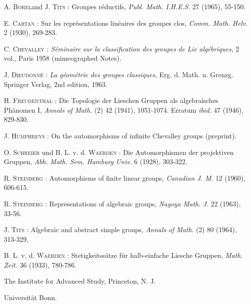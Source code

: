 \begin{thebibliography}{99}
 \textsc{A. Borel}\pageoriginale and \textsc{J. Tits :} Groupes r\'eductifs, {\em Publ. Math. I.H.E.S.} 27 (1965), 55-150.

 \textsc{E. Cartan :} Sur les repr\'esentations lin\'eaires des groupes clos, {\em Comm. Math. Helv.} 2 (1930), 269-283.

 \textsc{C. Chevalley :} {\em S\'eminaire sur la classification des groupes de Lie alg\'ebriques,} 2 vol., Paris 1958 (mimeographed Notes).

 \textsc{J. Dieudonn\'e :} {\em La g\'eom\'etrie des groupes classiques,} Erg. d. Math. u. Grenzg. Springer Verlag, 2nd edition, 1963.

 \textsc{H. Freudenthal :} Die Topologie der Lieschen Gruppen als algebraisches Ph\"anomen I, {\em Annals of Math.} (2) 42 (1941), 1051-1074. Erratum {\em ibid.} 47 (1946), 829-830.

 \textsc{J. Humphreys :} On the automorphisms of infinite Chevalley groups (preprint).

 \textsc{O. Schreier} und B. L. v. d. \textsc{Waerden :} Die Automorphismen der projektiven Gruppen, {\em Abh. Math. Sem. Hamburg Univ.} 6 (1928), 303-322.

 \textsc{R. Steinberg :} Automorphisms of finite linear groups, {\em Canadian J. M.} 12 (1960), 606-615.

 \textsc{R. Steinberg :} Representations of algebraic groups, {\em Nagoya Math. J.} 22 (1963), 33-56.

 \textsc{J. Tits :} Algebraic and abstract simple groups, {\em Annals of Math.} (2) 80 (1964), 313-329.

 B. L. v. d. \textsc{Waerden :} Stetigkeitss\"atze f\"ur halb-einfache Liesche Gruppen, {\em Math. Zeit.} 36 (1933), 780-786.

\end{thebibliography}

\medskip
\noindent
The Institute for Advanced Study, Princeton, N. J.

\noindent
Universit\"at Bonn.
